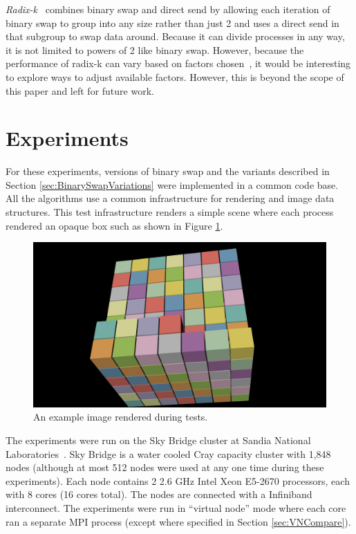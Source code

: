 \documentclass{vgtc}                          %
\newcommand*{\lcite}[1]{~\cite{#1}}
\newcommand*{\keyterm}[1]{\emph{#1}}
\begin{document}
\keyterm{Radix-k}\lcite{RadixK} combines binary swap and direct send by allowing each iteration of binary swap to group into any size rather than just 2 and uses a direct send in that subgroup to swap data around.
Because it can divide processes in any way, it is not limited to powers of 2 like binary swap.
However, because the performance of radix-k can vary based on factors chosen\lcite{Kendall2010,Moreland2011:SC}, it would be interesting to explore ways to adjust available factors.
However, this is beyond the scope of this paper and left for future work.

\section{Experiments}
\label{sec:Results}

For these experiments, versions of binary swap and the variants described in Section \ref{sec:BinarySwapVariations} were implemented in a common code base.
All the algorithms use a common infrastructure for rendering and image data structures.
This test infrastructure renders a simple scene where each process rendered an opaque box such as shown in Figure \ref{fig:RenderExample}.

\begin{figure}[htb]
  \centering
  \includegraphics[width=\linewidth]{render-example}
  \caption{An example image rendered during tests.}
  \label{fig:RenderExample}
\end{figure}

The experiments were run on the Sky Bridge cluster at Sandia National Laboratories\lcite{SkyBridge}.
Sky Bridge is a water cooled Cray capacity cluster with 1,848 nodes (although at most 512 nodes were used at any one time during these experiments).
Each node contains 2 2.6 GHz Intel Xeon E5-2670 processors, each with 8 cores (16 cores total).
The nodes are connected with a Infiniband interconnect.
The experiments were run in ``virtual node'' mode where each core ran a separate MPI process (except where specified in Section \ref{sec:VNCompare}).
\end{document}
